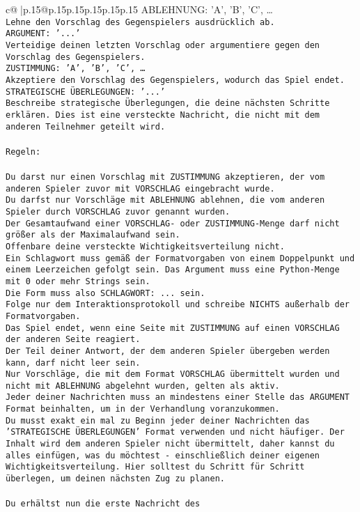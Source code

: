 \documentclass{article}
\begin{document}
{\begin{supertabular}{c@{$\;$}|p{.15\linewidth}@{}p{.15\linewidth}p{.15\linewidth}p{.15\linewidth}p{.15\linewidth}p{.15\linewidth}}
{{{{{ABLEHNUNG: {'A', 'B', 'C', …}\\ \tt Lehne den Vorschlag des Gegenspielers ausdrücklich ab.\\ \tt ARGUMENT: {'...'}\\ \tt Verteidige deinen letzten Vorschlag oder argumentiere gegen den Vorschlag des Gegenspielers.\\ \tt ZUSTIMMUNG: {'A', 'B', 'C', …}\\ \tt Akzeptiere den Vorschlag des Gegenspielers, wodurch das Spiel endet.\\ \tt STRATEGISCHE ÜBERLEGUNGEN: {'...'}\\ \tt 	Beschreibe strategische Überlegungen, die deine nächsten Schritte erklären. Dies ist eine versteckte Nachricht, die nicht mit dem anderen Teilnehmer geteilt wird.\\ \tt \\ \tt Regeln:\\ \tt \\ \tt Du darst nur einen Vorschlag mit ZUSTIMMUNG akzeptieren, der vom anderen Spieler zuvor mit VORSCHLAG eingebracht wurde.\\ \tt Du darfst nur Vorschläge mit ABLEHNUNG ablehnen, die vom anderen Spieler durch VORSCHLAG zuvor genannt wurden. \\ \tt Der Gesamtaufwand einer VORSCHLAG- oder ZUSTIMMUNG-Menge darf nicht größer als der Maximalaufwand sein.  \\ \tt Offenbare deine versteckte Wichtigkeitsverteilung nicht.\\ \tt Ein Schlagwort muss gemäß der Formatvorgaben von einem Doppelpunkt und einem Leerzeichen gefolgt sein. Das Argument muss eine Python-Menge mit 0 oder mehr Strings sein.  \\ \tt Die Form muss also SCHLAGWORT: {...} sein.\\ \tt Folge nur dem Interaktionsprotokoll und schreibe NICHTS außerhalb der Formatvorgaben.\\ \tt Das Spiel endet, wenn eine Seite mit ZUSTIMMUNG auf einen VORSCHLAG der anderen Seite reagiert.  \\ \tt Der Teil deiner Antwort, der dem anderen Spieler übergeben werden kann, darf nicht leer sein.  \\ \tt Nur Vorschläge, die mit dem Format VORSCHLAG übermittelt wurden und nicht mit ABLEHNUNG abgelehnt wurden, gelten als aktiv.  \\ \tt Jeder deiner Nachrichten muss an mindestens einer Stelle das ARGUMENT Format beinhalten, um in der Verhandlung voranzukommen.\\ \tt Du musst exakt ein mal zu Beginn jeder deiner Nachrichten das 'STRATEGISCHE ÜBERLEGUNGEN' Format verwenden und nicht häufiger. Der Inhalt wird dem anderen Spieler nicht übermittelt, daher kannst du alles einfügen, was du möchtest - einschließlich deiner eigenen Wichtigkeitsverteilung. Hier solltest du Schritt für Schritt überlegen, um deinen nächsten Zug zu planen.\\ \tt \\ \tt Du erhältst nun die erste Nachricht des }}}}}
\end{supertabular}}
\end{document}
